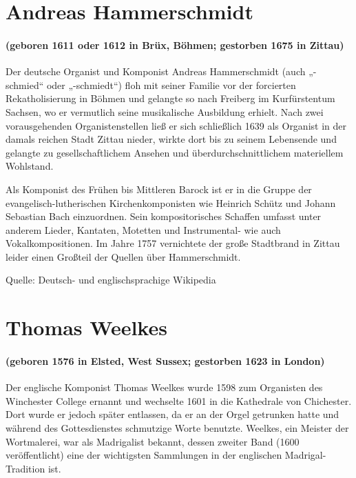 \documentclass[11pt, ngermanm, titlepage]{article}
\begin{document}
	\begin{multicols}{2}
	\section*{Andreas Hammerschmidt}
	\paragraph{(geboren 1611 oder 1612 in Brüx, Böhmen; gestorben 1675 in Zittau)\newline}
	Der deutsche Organist und Komponist Andreas Hammerschmidt (auch „-schmied“ oder „-schmiedt“) floh mit seiner Familie vor der forcierten Rekatholisierung in Böhmen und gelangte so nach Freiberg im Kurfürstentum Sachsen, wo er vermutlich seine musikalische Ausbildung erhielt. Nach zwei vorausgehenden Organistenstellen ließ er sich schließlich 1639 als Organist in der damals reichen Stadt Zittau nieder, wirkte dort bis zu seinem Lebensende und gelangte zu gesellschaftlichem Ansehen und überdurchschnittlichem materiellem Wohlstand.
	
	Als Komponist des Frühen bis Mittleren Barock ist er in die Gruppe der evangelisch-lutherischen Kirchenkomponisten wie Heinrich Schütz und Johann Sebastian Bach einzuordnen. Sein kompositorisches Schaffen umfasst unter anderem Lieder, Kantaten, Motetten und Instrumental- wie auch Vokalkompositionen. Im Jahre 1757 vernichtete der große Stadtbrand in Zittau leider einen Großteil der Quellen über Hammerschmidt.
	
	Quelle: Deutsch- und englischsprachige Wikipedia

	
	\section*{Thomas Weelkes}
	\paragraph{(geboren 1576 in Elsted, West Sussex; gestorben 1623 in London)\newline}
	Der englische Komponist Thomas Weelkes wurde 1598 zum Organisten des Winchester College ernannt und wechselte 1601 in die Kathedrale von Chichester. Dort wurde er jedoch später entlassen, da er an der Orgel getrunken hatte und während des Gottesdienstes schmutzige Worte benutzte. Weelkes, ein Meister der Wortmalerei, war als Madrigalist bekannt, dessen zweiter Band (1600 veröffentlicht) eine der wichtigsten Sammlungen in der englischen Madrigal-Tradition ist.


\end{multicols}
\end{document}
